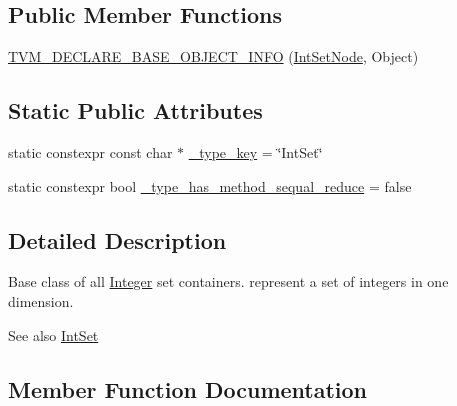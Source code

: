 \subsection*{Public Member Functions}
\begin{DoxyCompactItemize}
\item 
\hyperlink{classtvm_1_1arith_1_1IntSetNode_a689b913992364a60b3da1bc54ef13170}{T\+V\+M\+\_\+\+D\+E\+C\+L\+A\+R\+E\+\_\+\+B\+A\+S\+E\+\_\+\+O\+B\+J\+E\+C\+T\+\_\+\+I\+N\+FO} (\hyperlink{classtvm_1_1arith_1_1IntSetNode}{Int\+Set\+Node}, Object)
\end{DoxyCompactItemize}
\subsection*{Static Public Attributes}
\begin{DoxyCompactItemize}
\item 
static constexpr const char $\ast$ \hyperlink{classtvm_1_1arith_1_1IntSetNode_ab7cf9086177bae550fac2a09c8f9b397}{\+\_\+type\+\_\+key} = \char`\"{}Int\+Set\char`\"{}
\item 
static constexpr bool \hyperlink{classtvm_1_1arith_1_1IntSetNode_aedee1dbd20dfe7fd6aeddcc5be7b74d9}{\+\_\+type\+\_\+has\+\_\+method\+\_\+sequal\+\_\+reduce} = false
\end{DoxyCompactItemize}


\subsection{Detailed Description}
Base class of all \hyperlink{classtvm_1_1Integer}{Integer} set containers. represent a set of integers in one dimension. 

\begin{DoxySeeAlso}{See also}
\hyperlink{classtvm_1_1arith_1_1IntSet}{Int\+Set} 
\end{DoxySeeAlso}


\subsection{Member Function Documentation}

